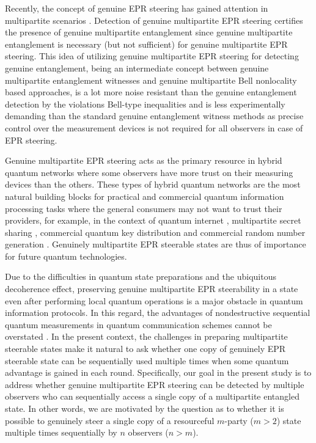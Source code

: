 \documentclass[pra,a4paper,aps,twocolumn,showpacs,superscriptaddress,groupedaddress]{revtex4}
\begin{document}
Recently, the concept of genuine EPR steering has gained attention in multipartite scenarios \cite{stm1,Li,Daniel,stm2,stm3,stm4}. Detection of genuine multipartite EPR steering certifies the presence of genuine multipartite entanglement since genuine multipartite entanglement is necessary (but not sufficient) for genuine multipartite EPR steering.  This idea of utilizing  genuine multipartite EPR steering for detecting genuine entanglement, being an intermediate concept between genuine multipartite entanglement witnesses and genuine multipartite Bell nonlocality based approaches, is a lot more noise resistant than the genuine entanglement detection by the violations Bell-type inequalities and is less experimentally demanding than the standard genuine entanglement witness methods as precise control over the measurement devices is not required for all observers in case of EPR steering.

Genuine multipartite EPR steering acts as the primary resource in hybrid quantum networks where some observers have more trust on their measuring devices than the others. These types of hybrid quantum networks are the most natural building blocks for practical and commercial quantum information processing tasks where the general consumers  may not want to trust their providers, for example, in the context of  quantum internet \cite{Kimble2008}, multipartite secret sharing \cite{Armstrong2015,sss1,sss2}, commercial quantum key distribution and commercial random number generation \cite{Daniel}.  Genuinely multipartite EPR steerable states are thus of  importance  for future quantum technologies.



Due to the difficulties in quantum state preparations and the ubiquitous decoherence effect, preserving genuine multipartite EPR steerability in a state even after performing local quantum operations is a major obstacle in  quantum information protocols. In this regard,  the advantages of nondestructive sequential quantum measurements in quantum communication schemes cannot be overstated \cite{Bergou2013}. In the present context, the challenges in preparing multipartite steerable states \cite{Armstrong2015,Mattar2017,Liu2020}  make it natural to ask whether one copy of genuinely EPR steerable state can be sequentially used multiple times when some quantum advantage is gained in each round. Specifically, our goal in the present study is to address whether genuine multipartite EPR steering can be detected by multiple observers who can sequentially access a single copy of a multipartite entangled state. In other words, we are motivated by the question as to whether it is possible to genuinely steer a single copy of a resourceful $m$-party ($m > 2$) state multiple times sequentially by $n$ observers ($n > m$).
\end{document}
